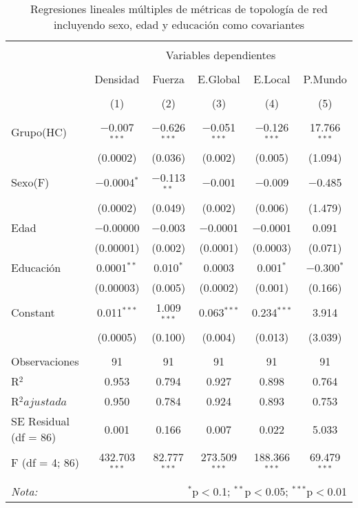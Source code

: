 \begin{table}[!htbp] \centering
  \caption{Regresiones lineales múltiples de métricas de topología de red incluyendo sexo, edad y educación como covariantes}
  \label{tab:lmHC}
  \small
\begin{tabular}{@{\extracolsep{5pt}}lccccc}
\\[-1.8ex]\hline
\hline \\[-1.8ex]
 & \multicolumn{5}{c}{Variables dependientes} \\
\cline{2-6}
\\[-1.8ex] & Densidad & Fuerza & E.Global & E.Local & P.Mundo \\
\\[-1.8ex] & (1) & (2) & (3) & (4) & (5)\\
\hline \\[-1.8ex]
 Grupo(HC) & $-$0.007$^{***}$ & $-$0.626$^{***}$ & $-$0.051$^{***}$ & $-$0.126$^{***}$ & 17.766$^{***}$ \\
  & (0.0002) & (0.036) & (0.002) & (0.005) & (1.094) \\
  Sexo(F) & $-$0.0004$^{*}$ & $-$0.113$^{**}$ & $-$0.001 & $-$0.009 & $-$0.485 \\
  & (0.0002) & (0.049) & (0.002) & (0.006) & (1.479) \\
  Edad & $-$0.00000 & $-$0.003 & $-$0.0001 & $-$0.0001 & 0.091 \\
  & (0.00001) & (0.002) & (0.0001) & (0.0003) & (0.071) \\
  Educación & 0.0001$^{**}$ & 0.010$^{*}$ & 0.0003 & 0.001$^{*}$ & $-$0.300$^{*}$ \\
  & (0.00003) & (0.005) & (0.0002) & (0.001) & (0.166) \\
  Constant & 0.011$^{***}$ & 1.009$^{***}$ & 0.063$^{***}$ & 0.234$^{***}$ & 3.914 \\
  & (0.0005) & (0.100) & (0.004) & (0.013) & (3.039) \\
 \hline \\[-1.8ex]
Observaciones & 91 & 91 & 91 & 91 & 91 \\
R$^{2}$ & 0.953 & 0.794 & 0.927 & 0.898 & 0.764 \\
R$^{2} ajustada$ & 0.950 & 0.784 & 0.924 & 0.893 & 0.753 \\
SE Residual (df = 86) & 0.001 & 0.166 & 0.007 & 0.022 & 5.033 \\
F (df = 4; 86) & 432.703$^{***}$ & 82.777$^{***}$ & 273.509$^{***}$ & 188.366$^{***}$ & 69.479$^{***}$ \\
\hline
\hline \\[-1.8ex]
\textit{Nota:}  & \multicolumn{5}{r}{$^{*}$p$<$0.1; $^{**}$p$<$0.05; $^{***}$p$<$0.01} \\
\end{tabular}
\end{table}

